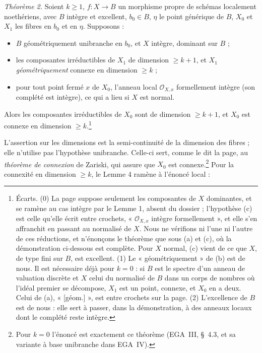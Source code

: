 \documentclass[11pt,a4paper]{article}
\begin{document}
\emph{Théorème 2.} Soient $k \geq 1$, $f\colon X \to B$ un morphisme propre
de schémas localement noethériens, avec $B$ intègre et excellent, $b_0 \in B$,
$\eta$ le point générique de $B$, $X_0$ et $X_1$ les fibres en $b_0$ et en
$\eta$. Supposons :
\begin{itemize}
\item[(a)] $B$ géométriquement unibranche en $b_0$, et $X$ intègre,
dominant sur $B$ ;
\item[(b)] les composantes irréductibles de $X_1$ de dimension $\geq k+1$, et
$X_1$ \emph{géométriquement} connexe en dimension $\geq k$ ;
\item[(c)] pour tout point fermé $x$ de $X_0$, l'anneau local
$\mathcal{O}_{X,x}$ formellement intègre (son complété est intègre), ce qui a
lieu si $X$ est normal.
\end{itemize}
Alors les composantes irréductibles de $X_0$ sont de dimension $\geq k+1$, et
$X_0$ est connexe en dimension $\geq k$.\footnote{Écarts. (0) La page suppose
seulement les composantes de $X$ dominantes, et se ramène au cas intègre par
le Lemme 1, absent du dossier ; l'hypothèse (c) est celle qu'elle écrit entre
crochets, « $\mathcal{O}_{X,x}$ intègre formellement », et elle s'en affranchit
en passant au normalisé de $X$. Nous ne vérifions ni l'une ni l'autre de ces
réductions, et n'énonçons le théorème que sous (a) et (c), où la démonstration
ci-dessous est complète. Pour $X$ normal, (c) vient de ce que $X$, de type fini
sur $B$, est excellent. (1) Le
« géométriquement » de (b) est de nous. Il est nécessaire déjà pour $k = 0$ :
si $B$ est le spectre d'un anneau de valuation discrète et $X$ celui du
normalisé de $B$ dans un corps de nombres où l'idéal premier se décompose,
$X_1$ est un point, connexe, et $X_0$ en a deux. Celui de (a), « [géom.] »,
est entre crochets sur la page. (2) L'excellence de $B$ est de nous : elle sert
à passer, dans la démonstration, à des anneaux locaux dont le complété reste
intègre.}

L'assertion sur les dimensions est la semi-continuité de la dimension des
fibres ; elle n'utilise pas l'hypothèse unibranche. Celle-ci sert, comme le
dit la page, au \emph{théorème de connexion} de Zariski, qui assure que $X_0$
est connexe.\footnote{Pour $k = 0$ l'énoncé est exactement ce théorème (EGA~III,
§~4.3, et sa variante à base unibranche dans EGA~IV).} Pour la connexité en
dimension $\geq k$, le Lemme 4 ramène à l'énoncé local :
\end{document}

